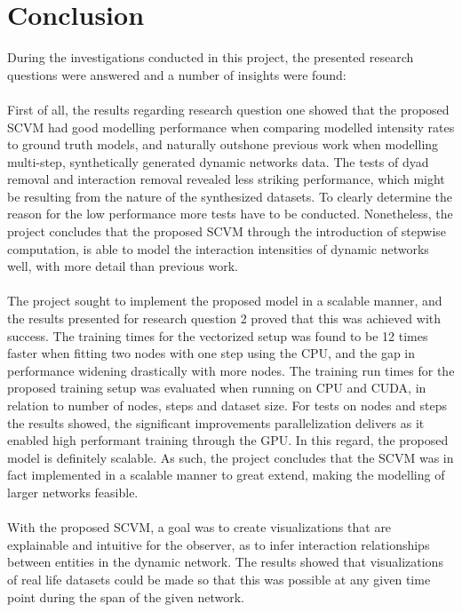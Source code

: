 \section{Conclusion}

During the investigations conducted in this project, the presented research questions were answered and a number of insights were found:
\\\\
First of all, the results regarding research question one showed that the proposed SCVM had good modelling performance when comparing modelled intensity rates to ground truth models, and naturally outshone previous work when modelling multi-step, synthetically generated dynamic networks data.
The tests of dyad removal and interaction removal revealed less striking performance, which might be resulting from the nature of the synthesized datasets. To clearly determine the reason for the low performance more tests have to be conducted.
Nonetheless, the project concludes that the proposed SCVM through the introduction of stepwise computation, is able to model the interaction intensities of dynamic networks well, with more detail than previous work.
\\\\
The project sought to implement the proposed model in a scalable manner, and the results presented for research question 2 proved that this was achieved with success.
The training times for the vectorized setup was found to be 12 times faster when fitting two nodes with one step using the CPU, and the gap in performance widening drastically with more nodes.
The training run times for the proposed training setup was evaluated when running on CPU and CUDA, in relation to number of nodes, steps and dataset size. For tests on nodes and steps the results showed, the significant improvements parallelization delivers as it enabled high performant training through the GPU. In this regard, the proposed model is definitely scalable.
As such, the project concludes that the SCVM was in fact implemented in a scalable manner to great extend, making the modelling of larger networks feasible.
\\\\
With the proposed SCVM, a goal was to create visualizations that are explainable and intuitive for the observer, as to infer interaction relationships between entities in the dynamic network.
The results showed that visualizations of real life datasets could be made so that this was possible at any given time point during the span of the given network.
